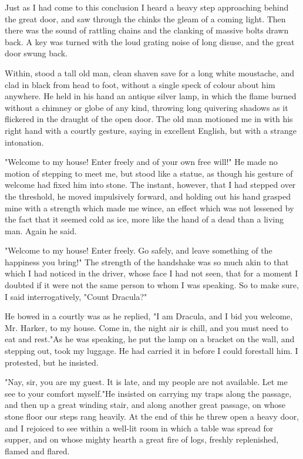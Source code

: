 Just as I had come to this conclusion I heard a heavy step approaching behind the great door, and saw through the chinks the gleam of a coming light. Then there was the sound of rattling chains and the clanking of massive bolts drawn back. A key was turned with the loud grating noise of long disuse, and the great door swung back. 

Within, stood a tall old man, clean shaven save for a long white moustache, and clad in black from head to foot, without a single speck of colour about him anywhere. He held in his hand an antique silver lamp, in which the flame burned without a chimney or globe of any kind, throwing long quivering shadows as it flickered in the draught of the open door. The old man motioned me in with his right hand with a courtly gesture, saying in excellent English, but with a strange intonation. 

"Welcome to my house! Enter freely and of your own free will!" He made no motion of stepping to meet me, but stood like a statue, as though his gesture of welcome had fixed him into stone. The instant, however, that I had stepped over the threshold, he moved impulsively forward, and holding out his hand grasped mine with a strength which made me wince, an effect which was not lessened by the fact that it seemed cold as ice, more like the hand of a dead than a living man. Again he said. 

"Welcome to my house! Enter freely. Go safely, and leave something of the happiness you bring!" The strength of the handshake was so much akin to that which I had noticed in the driver, whose face I had not seen, that for a moment I doubted if it were not the same person to whom I was speaking. So to make sure, I said interrogatively, "Count Dracula?" 

He bowed in a courtly was as he replied, "I am Dracula, and I bid you welcome, Mr. Harker, to my house. Come in, the night air is chill, and you must need to eat and rest."As he was speaking, he put the lamp on a bracket on the wall, and stepping out, took my luggage. He had carried it in before I could forestall him. I protested, but he insisted. 

"Nay, sir, you are my guest. It is late, and my people are not available. Let me see to your comfort myself."He insisted on carrying my traps along the passage, and then up a great winding stair, and along another great passage, on whose stone floor our steps rang heavily. At the end of this he threw open a heavy door, and I rejoiced to see within a well-lit room in which a table was spread for supper, and on whose mighty hearth a great fire of logs, freshly replenished, flamed and flared. 

